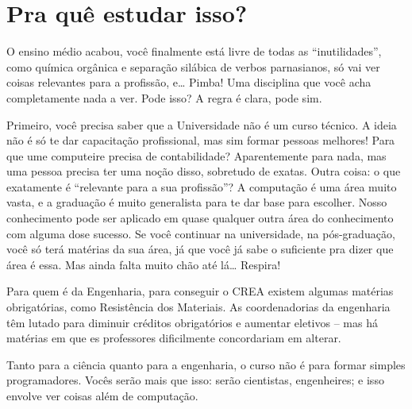 \section{Pra quê estudar isso?}

O ensino médio acabou, você finalmente está livre de todas as “inutilidades”, como  química orgânica e separação silábica de verbos parnasianos, só vai ver coisas  relevantes para a profissão, e… Pimba! Uma disciplina que você acha completamente  nada a ver. Pode isso? A regra é clara, pode sim. 

Primeiro, você precisa saber que a Universidade não é um curso técnico. A ideia não é  só te dar capacitação profissional, mas sim formar pessoas melhores! Para que ume computeire precisa de contabilidade? Aparentemente para nada, mas  uma pessoa precisa ter uma noção disso, sobretudo de exatas. Outra coisa: o que  exatamente é “relevante para a sua profissão”? A computação é uma área muito vasta, e  a graduação é muito generalista para te dar base para escolher. Nosso conhecimento  pode ser aplicado em quase qualquer outra área do conhecimento com alguma dose  sucesso. Se você continuar na universidade, na pós-graduação, você só terá matérias da  sua área, já que você já sabe o suficiente pra dizer que área é essa. Mas ainda falta  muito chão até lá… Respira! 

Para quem é da Engenharia, para conseguir o CREA existem algumas matérias  obrigatórias, como Resistência dos Materiais. As coordenadorias da engenharia têm  lutado para diminuir créditos obrigatórios e aumentar eletivos – mas há matérias em  que es professores dificilmente concordariam em alterar.  

Tanto para a ciência quanto para a engenharia, o curso não é para formar simples  programadores. Vocês serão mais que isso: serão cientistas, engenheires; e isso envolve  ver coisas além de computação.
